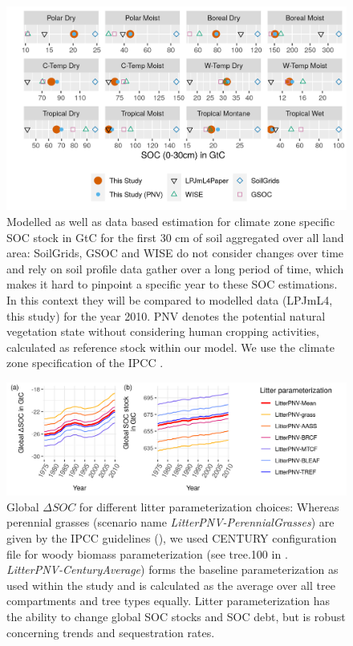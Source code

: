 \documentclass[gc, manuscript]{copernicus}
\begin{document}
\begin{figure}
\includegraphics[width=16cm]{../ResultNotebooks/Output/Images/reg_comparisonfigure} 
\caption{Modelled as well as data based estimation for climate zone specific SOC stock in GtC for the first 30 cm of soil aggregated over all land area: SoilGrids, GSOC and WISE do not consider changes over time and rely on soil profile data gather over a long period of time, which makes it hard to pinpoint a specific year to these SOC estimations. In this context they will be compared to modelled data (LPJmL4, this study) for the year 2010. PNV denotes the potential natural vegetation state without considering human cropping activities, calculated as reference stock within our model. We use the climate zone specification of the IPCC \cite{eggleston_ipcc_2006}.}
\label{fig:SOCreg}
\end{figure}

\begin{figure}
\includegraphics[width=16cm]{../ResultNotebooks/Output/Images/scenario_litter} 
\caption{Global $\Delta SOC$ for different litter parameterization choices: Whereas perennial grasses (scenario name \textit{LitterPNV-PerennialGrasses}) are given by the IPCC guidelines (\cite{calvo_buendia_ipcc_2019}), we used CENTURY configuration file for woody biomass parameterization (see tree.100 in \cite{century_model_2000}. \textit{LitterPNV-CenturyAverage}) forms the baseline parameterization as used within the study and is calculated as the average over all tree compartments and tree types equally. Litter parameterization has the ability to change global SOC stocks and SOC debt, but is robust concerning trends and sequestration rates.}
\label{fig:SOClitter}
\end{figure}
\noappendix
\end{document}
